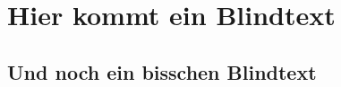 \documentclass{scrartcl}
\begin{document}
\section{Hier kommt ein Blindtext}
\Blindtext[2][3]

\subsection{Und noch ein bisschen Blindtext}
\Blindtext[5]
\end{document}
